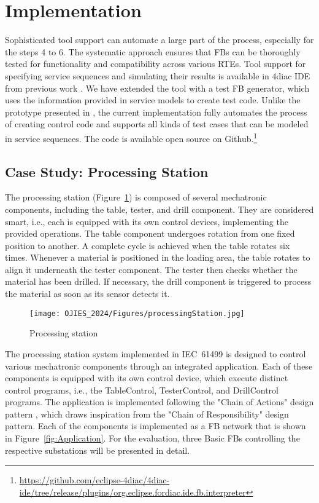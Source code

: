 \section{Implementation}
\label{sec::implementation}
Sophisticated tool support can automate a large part of the process, especially for the steps 4 to 6. The systematic approach ensures that FBs can be thoroughly tested for functionality and compatibility across various RTEs.
Tool support for specifying service sequences and simulating their results is available in 4diac IDE from previous work \cite{wiesmayr2021}. We have extended the tool with a test FB generator, which uses the information provided in service models to create test code. Unlike the prototype presented in \cite{biancaMidhunETFAwip}, the current implementation fully automates the process of creating control code and supports all kinds of test cases that can be modeled in service sequences. The code is available open source on Github.\footnote{\url{https://github.com/eclipse-4diac/4diac-ide/tree/release/plugins/org.eclipse.fordiac.ide.fb.interpreter}}


\subsection{Case Study: Processing Station}
\label{sec::casestudy}
\label{sec:drilling}
 
The processing station (Figure~\ref{fig:ps}) is composed of several mechatronic components, including the table, tester,  and drill component. They are considered smart, i.e., each is equipped with its own control devices, implementing the provided operations. The table component undergoes rotation from one fixed position to another. A complete cycle is achieved when the table rotates six times. Whenever a material is positioned in the loading area, the table rotates to align it underneath the tester component. The tester then checks whether the material has been drilled. If necessary, the drill component is triggered to process the material as soon as its sensor detects it. 

\begin{figure}[!t]
	\centering
		\texttt{[image: OJIES\_2024/Figures/processingStation.jpg]}
		\caption{Processing station}
		\label{fig:ps}	
 \end{figure}

The processing station system implemented in IEC~61499 is designed to control various mechatronic components through an integrated application. Each of these components is equipped with its own control device, which execute distinct control programs, i.e., the TableControl, TesterControl, and DrillControl programs. The application is implemented following the "Chain of Actions" design pattern \cite{Patil.2018}, which draws inspiration from the "Chain of Responsibility" design pattern. Each of the components is implemented as a FB network that is shown in Figure~\ref{fig:Application}. For the evaluation, three Basic FBs controlling the respective substations will be presented in detail.

